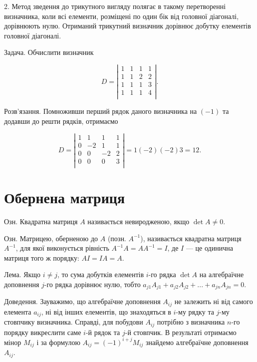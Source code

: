 2. Метод зведення до трикутного вигляду полягає в такому перетворенні
визначника, коли всі елементи, розміщені по один бік від головної діагоналі,
дорівнюють нулю. Отриманий трикутний визначник дорівнює добутку елементів
головної діагоналі.


Задача. Обчислити визначник

$$D = \left|\begin{matrix}
	1 & 1 & 1 & 1 \\
	1 & 1 & 2 & 2 \\
	1 & 1 & 1 & 3 \\
	1 & 1 & 1 & 4 \\
\end{matrix} \right|.$$


Розв’язання. Помноживши перший рядок даного визначника на $(-1)$ та
додавши до решти рядків, отримаємо

$$D = \left|\begin{matrix}
	1 & 1  & 1  & 1 \\
	0 & -2 & 1  & 1 \\
	0 & 0  & -2 & 2 \\
	0 & 0  & 0  & 3 \\
\end{matrix} \right| = 1(-2)(-2)3 = 12.$$

\section{Обернена матриця}

Озн. Квадратна матриця $A$ називається невиродженою, якщо $\det A \neq 0$.

Озн. Матрицею, оберненою до $A$ (позн. $A^{-1}$), називається квадратна матриця
$A^{-1}$, для якої виконується рівність $A^{-1} A = A A^{-1} = I$, де $I$ --- це одинична матриця
того ж порядку: $A I = I A = A$.


Лема. Якщо $i \neq j$, то сума добутків елементів $i$-го рядка $\det A$ на алгебраїчне
доповнення $j$-го рядка дорівнює нулю, тобто $a_{j1} A_{j1} + a_{j2} A_{j2} + ... + a_{jn} A_{jn} = 0$.


Доведення. Зауважимо, що алгебраїчне доповнення $A_{ij}$ не залежить ні від
самого елемента $a_{ij}$, ні від інших елементів, що знаходяться в $i$-му рядку та $j$-му
стовпчику визначника. Справді, для побудови $A_{ij}$ потрібно з визначника $n$-го
порядку викреслити саме $i$-й рядок та $j$-й стовпчик. В результаті отримаємо мінор
$M_{ij}$ і за формулою $A_{ij} = (-1)^{i+j}M_{ij}$ знайдемо алгебраїчне доповнення $A_{ij}$.


